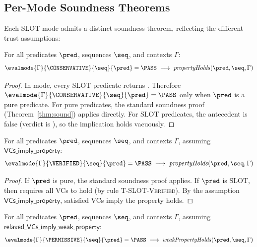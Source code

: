 \subsection{Per-Mode Soundness Theorems}\label{sec:per-mode-soundness}

Each SLOT mode admits a distinct soundness theorem, reflecting the
different trust assumptions:

\begin{theorem}\label{thm:cons-sound}
For all predicates $\pred$, sequences $\seq$, and contexts $\Gamma$:
\[
  \evalmode{\Gamma}{\CONSERVATIVE}{\seq}{\pred} = \PASS
  \;\longrightarrow\;
  \mathit{propertyHolds}(\pred, \seq, \Gamma)
\]
\end{theorem}

\begin{proof}
In \CONSERVATIVE{} mode, every SLOT predicate returns \UNCERTAIN.
Therefore $\evalmode{\Gamma}{\CONSERVATIVE}{\seq}{\pred} = \PASS$
only when $\pred$ is a pure predicate.
For pure predicates, the standard soundness proof (Theorem~\ref{thm:sound})
applies directly.
For SLOT predicates, the antecedent is false (verdict is \UNCERTAIN),
so the implication holds vacuously.
\end{proof}

\begin{theorem}\label{thm:ver-sound}
For all predicates $\pred$, sequences $\seq$, and contexts $\Gamma$,
assuming $\textsf{VCs\_imply\_property}$:
\[
  \evalmode{\Gamma}{\VERIFIED}{\seq}{\pred} = \PASS
  \;\longrightarrow\;
  \mathit{propertyHolds}(\pred, \seq, \Gamma)
\]
\end{theorem}

\begin{proof}
If $\pred$ is pure, the standard soundness proof applies.
If $\pred$ is SLOT, then \PASS{} requires all VCs to hold (by rule
\textsc{T-SLOT-Verified}).
By the assumption $\textsf{VCs\_imply\_property}$, satisfied VCs
imply the property holds.
\end{proof}

\begin{theorem}\label{thm:perm-sound}
For all predicates $\pred$, sequences $\seq$, and contexts $\Gamma$,
assuming $\textsf{relaxed\_VCs\_imply\_weak\_property}$:
\[
  \evalmode{\Gamma}{\PERMISSIVE}{\seq}{\pred} = \PASS
  \;\longrightarrow\;
  \mathit{weakPropertyHolds}(\pred, \seq, \Gamma)
\]
\end{theorem}


